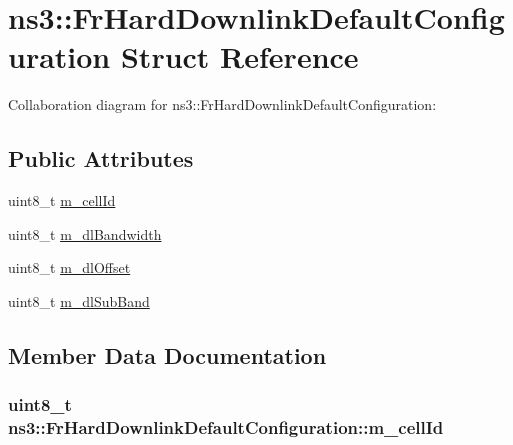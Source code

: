 \hypertarget{structns3_1_1FrHardDownlinkDefaultConfiguration}{}\section{ns3\+:\+:Fr\+Hard\+Downlink\+Default\+Configuration Struct Reference}
\label{structns3_1_1FrHardDownlinkDefaultConfiguration}


Collaboration diagram for ns3\+:\+:Fr\+Hard\+Downlink\+Default\+Configuration\+:
\subsection*{Public Attributes}
\begin{DoxyCompactItemize}
\item 
uint8\+\_\+t \hyperlink{structns3_1_1FrHardDownlinkDefaultConfiguration_a387bedaba619fcc97bf1928be0225b39}{m\+\_\+cell\+Id}
\item 
uint8\+\_\+t \hyperlink{structns3_1_1FrHardDownlinkDefaultConfiguration_a2566e765f668b22d24370185206ba542}{m\+\_\+dl\+Bandwidth}
\item 
uint8\+\_\+t \hyperlink{structns3_1_1FrHardDownlinkDefaultConfiguration_a3c9aecd282b15dd191a76c1553a03210}{m\+\_\+dl\+Offset}
\item 
uint8\+\_\+t \hyperlink{structns3_1_1FrHardDownlinkDefaultConfiguration_aa112a3923d8d7c0de6f5830dc4e979be}{m\+\_\+dl\+Sub\+Band}
\end{DoxyCompactItemize}


\subsection{Member Data Documentation}
\subsubsection[{\texorpdfstring{m\+\_\+cell\+Id}{m_cellId}}]{\setlength{\rightskip}{0pt plus 5cm}uint8\+\_\+t ns3\+::\+Fr\+Hard\+Downlink\+Default\+Configuration\+::m\+\_\+cell\+Id}\hypertarget{structns3_1_1FrHardDownlinkDefaultConfiguration_a387bedaba619fcc97bf1928be0225b39}{}\label{structns3_1_1FrHardDownlinkDefaultConfiguration_a387bedaba619fcc97bf1928be0225b39}
